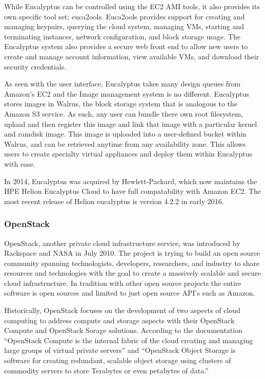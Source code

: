 While Eucalyptus can be controlled using the EC2 AMI tools, it also provides its own specific tool set; euca2ools. Euca2ools provides support for creating and managing keypairs, querying the cloud system, managing VMs, starting and terminating instances, network configuration, and block storage usage.  The Eucalyptus system also provides a secure web front end to allow new users to create and manage account information, view available VMs, and download their security credentials. 

As seen with the user interface, Eucalyptus takes many design queues from Amazon’s EC2 and the Image management system is no different.  Eucalyptus stores images in Walrus, the block storage system that is analogous to the Amazon S3 service.  As such, any user can bundle there own root filesystem, upload and then register this image and link that image with a particular kernel and ramdisk image.  This image is uploaded into a user-defined bucket within Walrus, and can be retrieved anytime from any availability zone.  This allows users to create specialty virtual appliances and deploy them within Eucalyptus with ease.  

In 2014, Eucalyptus was acquired by Hewlett-Packard, which now maintains the HPE Helion Eucalyptus Cloud to have full compatability with Amazon EC2. The most recent release of Helion eucalyptus is version 4.2.2 in early 2016.  

\subsubsection{OpenStack}

OpenStack, another private cloud infrastructure service, was introduced by Rackspace and NASA in July 2010. The project is trying to build an open source community spanning technologists, developers, researchers, and industry to share resources and technologies with the goal to create a massively scalable and secure cloud infrastructure. In tradition with other open source projects the entire software is open sources and limited to just open source API's such as Amazon.

 
Historically, OpenStack focuses on the development of two aspects of cloud computing to address compute and storage aspects with their OpenStack Compute and OpenStack Sorage solutions. According to the documentation ``OpenStack Compute is the internal fabric of the cloud creating and managing large groups of virtual private servers'' and ``OpenStack Object Storage is software for creating redundant, scalable object storage using clusters of commodity servers to store Terabytes or even petabytes of data.''  

